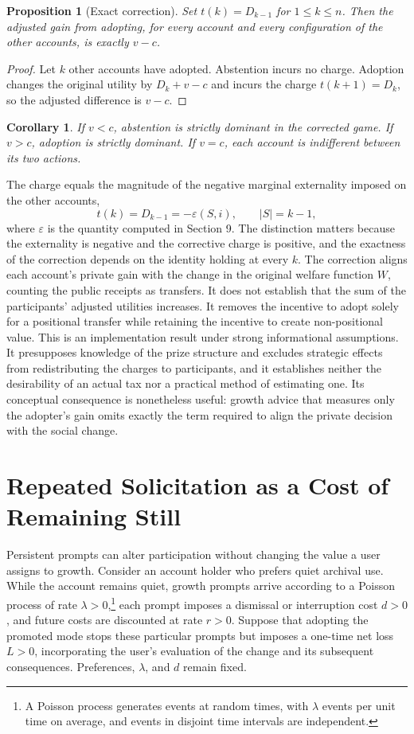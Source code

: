 \documentclass[12pt]{article}
\theoremstyle{plain}
\newtheorem{proposition}{Proposition}
\newtheorem{corollary}{Corollary}
\theoremstyle{definition}
\begin{document}
\begin{proposition}[Exact correction]
Set $t(k)=D_{k-1}$ for $1\le k\le n$. Then the adjusted gain from adopting, for every account and every configuration of the other accounts, is exactly $v-c$.
\end{proposition}

\begin{proof}
Let $k$ other accounts have adopted. Abstention incurs no charge. Adoption changes the original utility by $D_k+v-c$ and incurs the charge $t(k+1)=D_k$, so the adjusted difference is $v-c$.
\end{proof}

\begin{corollary}
If $v<c$, abstention is strictly dominant in the corrected game. If $v>c$, adoption is strictly dominant. If $v=c$, each account is indifferent between its two actions.
\end{corollary}

The charge equals the magnitude of the negative marginal externality imposed on the other accounts,
\[
t(k)=D_{k-1}=-\varepsilon(S,i),\qquad |S|=k-1,
\]
where $\varepsilon$ is the quantity computed in Section 9. The distinction matters because the externality is negative and the corrective charge is positive, and the exactness of the correction depends on the identity holding at every $k$. The correction aligns each account's private gain with the change in the original welfare function $W$, counting the public receipts as transfers. It does not establish that the sum of the participants' adjusted utilities increases. It removes the incentive to adopt solely for a positional transfer while retaining the incentive to create non-positional value. This is an implementation result under strong informational assumptions. It presupposes knowledge of the prize structure and excludes strategic effects from redistributing the charges to participants, and it establishes neither the desirability of an actual tax nor a practical method of estimating one. Its conceptual consequence is nonetheless useful: growth advice that measures only the adopter's gain omits exactly the term required to align the private decision with the social change.

\section{Repeated Solicitation as a Cost of Remaining Still}

Persistent prompts can alter participation without changing the value a user assigns to growth. Consider an account holder who prefers quiet archival use. While the account remains quiet, growth prompts arrive according to a Poisson process of rate $\lambda>0$,\footnote{A Poisson process generates events at random times, with $\lambda$ events per unit time on average, and events in disjoint time intervals are independent.} each prompt imposes a dismissal or interruption cost $d>0$, and future costs are discounted at rate $r>0$. Suppose that adopting the promoted mode stops these particular prompts but imposes a one-time net loss $L>0$, incorporating the user's evaluation of the change and its subsequent consequences. Preferences, $\lambda$, and $d$ remain fixed.
\end{document}
